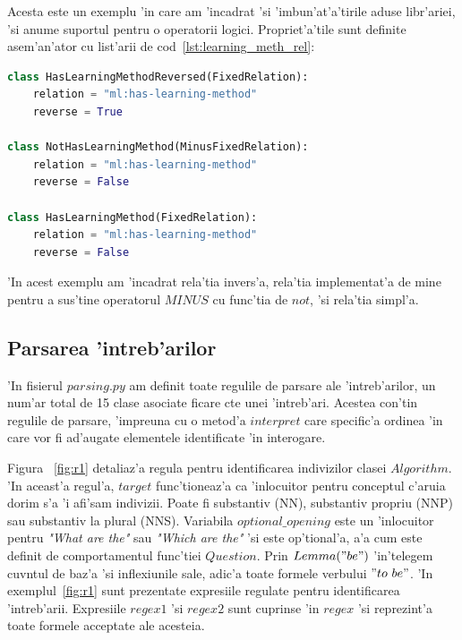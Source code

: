 \documentclass[12pt,a4paper,twoside]{report}
\begin{document}
Acesta este un exemplu 'in care am 'incadrat 'si 'imbun'at'a'tirile aduse libr'ariei, 'si anume suportul pentru o operatorii logici. Propriet'a'tile sunt definite asem'an'ator cu list'arii de cod~\ref{lst:learning_meth_rel}:

\begin{lstlisting}[basicstyle=\footnotesize, language = Python, label = lst:learning_meth_rel, caption = Proprietatea has-learning-method]
class HasLearningMethodReversed(FixedRelation):
    relation = "ml:has-learning-method"
    reverse = True

class NotHasLearningMethod(MinusFixedRelation):
    relation = "ml:has-learning-method"
    reverse = False

class HasLearningMethod(FixedRelation):
    relation = "ml:has-learning-method"
    reverse = False

\end{lstlisting}

'In acest exemplu am 'incadrat rela'tia invers'a, rela'tia implementat'a de mine pentru a sus'tine operatorul $MINUS$ cu func'tia de $not$, 'si rela'tia simpl'a.


\subsection{Parsarea 'intreb'arilor}
\label{sec:parse}

'In fisierul $parsing.py$ am definit toate regulile de parsare ale 'intreb'arilor, un num'ar total de 15 clase asociate ficare c\ia te unei 'intreb'ari. Acestea con'tin regulile de parsare, 'impreuna cu o metod'a $interpret$ care specific'a ordinea 'in care vor fi ad'augate elementele identificate 'in interogare. 

Figura ~\ref{fig:r1} detaliaz'a regula pentru identificarea indivizilor clasei $Algorithm$. 'In aceast'a regul'a, $target$ func'tioneaz'a ca 'inlocuitor pentru conceptul c'aruia dorim s'a 'i afi'sam indivizii. Poate fi substantiv (NN), substantiv propriu (NNP) sau substantiv la plural (NNS). Variabila $optional\_opening$ este un 'inlocuitor pentru {\it"What are the"} sau {\it"Which are the"} 'si este op'tional'a, a'a cum este definit de comportamentul func'tiei $Question$. Prin $Lemma("be")$ 'in'telegem cuv\ia ntul de baz'a 'si inflexiunile sale, adic'a toate formele verbului $"to\ be"$. 'In exemplul~\ref{fig:r1} sunt prezentate expresiile regulate pentru identificarea 'intreb'arii.
Expresiile $regex1$ 'si $regex2$ sunt cuprinse 'in $regex$ 'si reprezint'a toate formele acceptate ale acesteia.
\end{document}
